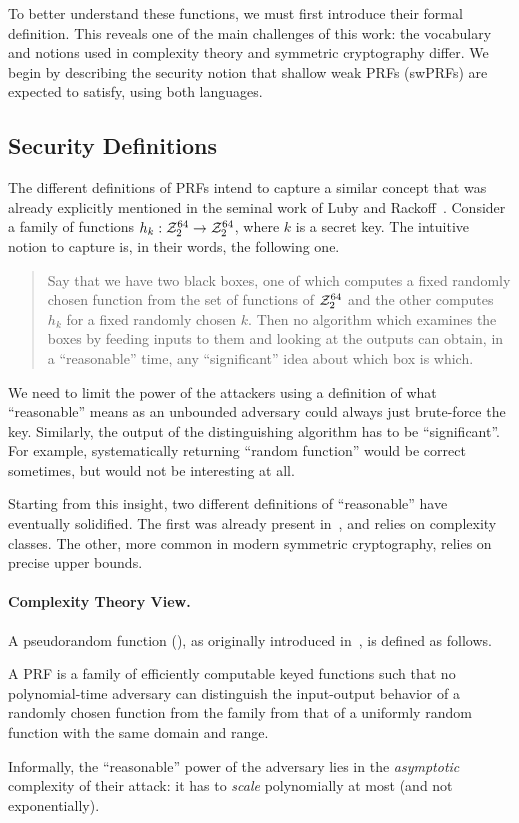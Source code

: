 To better understand these functions, we must first introduce their formal definition. This reveals one of the main challenges of this work: the vocabulary and notions used in complexity theory and symmetric cryptography differ. We begin by describing the security notion that shallow weak PRFs (swPRFs) are expected to satisfy, using both languages.



\subsection{Security Definitions}

The different definitions of PRFs intend to capture a similar concept that was already explicitly mentioned in the seminal work of Luby and Rackoff~\cite{LubRac88}. Consider a family of functions $h_k : \mathcal{Z}_2^{64} \to \mathcal{Z}_2^{64}$, where $k$ is a secret key. The intuitive notion to capture is, in their words, the following one.
\begin{quote}
  Say that we have two black boxes, one of which computes a fixed randomly chosen
function from the set of functions of $\mathcal{Z}_2^{64}$ and the other computes $h_k$ for a fixed randomly chosen $k$.
Then no algorithm which examines the boxes by feeding inputs to them and
looking at the outputs can obtain, in a ``reasonable'' time, any ``significant'' idea
about which box is which.
\end{quote}
We need to limit the power of the attackers using a definition of what ``reasonable'' means as an unbounded adversary could always just brute-force the key. Similarly, the output of the distinguishing algorithm has to be ``significant''. For example, systematically returning ``random function'' would be correct sometimes, but would not be interesting at all.

Starting from this insight, two different definitions of ``reasonable'' have eventually solidified. The first was already present in~\cite{LubRac88}, and relies on complexity classes. The other, more common in modern symmetric cryptography, relies on precise upper bounds.

\paragraph{Complexity Theory View.}

A pseudorandom function (\PRF), as originally introduced in~\cite{FOCS:GolGolMic84}, is defined as follows.
\begin{definition}
  A PRF is a family of efficiently computable keyed functions such that no polynomial-time adversary can distinguish the input-output behavior of a randomly chosen function from the family from that of a uniformly random function with the same domain and range.  
\end{definition}
Informally, the ``reasonable'' power of the adversary lies in the \emph{asymptotic} complexity of their attack: it has to \emph{scale} polynomially at most (and not exponentially).

